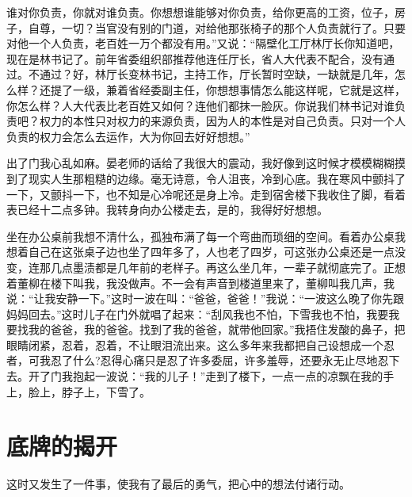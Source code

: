 \documentclass[12pt,oneside]{book}
\begin{document}
谁对你负责，你就对谁负责。你想想谁能够对你负责，给你更高的工资，位子，房子，自尊，一切？当官没有别的门道，对给他那张椅子的那个人负责就行了。只要对他一个人负责，老百姓一万个都没有用。''又说：``隔壁化工厅林厅长你知道吧，现在是林书记了。前年省委组织部推荐他连任厅长，省人大代表不配合，没有通过。不通过？好，林厅长变林书记，主持工作，厅长暂时空缺，一缺就是几年，怎么样？还提了一级，兼着省经委副主任，你想想事情怎么能这样呢，它就是这样，你怎么样？人大代表比老百姓又如何？连他们都抹一脸灰。你说我们林书记对谁负责吧？权力的本性只对权力的来源负责，因为人的本性是对自己负责。只对一个人负责的权力会怎么去运作，大为你回去好好想想。''

出了门我心乱如麻。晏老师的话给了我很大的震动，我好像到这时候才模模糊糊摸到了现实人生那粗糙的边缘。毫无诗意，令人沮丧，冷到心底。我在寒风中颤抖了一下，又颤抖一下，也不知是心冷呢还是身上冷。走到宿舍楼下我收住了脚，看着表已经十二点多钟。我转身向办公楼走去，是的，我得好好想想。

坐在办公桌前我想不清什么，孤独布满了每一个弯曲而琐细的空间。看着办公桌我想着自己在这张桌子边也坐了四年多了，人也老了四岁，可这张办公桌还是一点没变，连那几点墨渍都是几年前的老样子。再这么坐几年，一辈子就彻底完了。正想着董柳在楼下叫我，我没做声。不一会有声音到楼道里来了，董柳叫我几声，我说：``让我安静一下。''这时一波在叫：``爸爸，爸爸！''我说：``一波这么晚了你先跟妈妈回去。''这时儿子在门外就唱了起来：``刮风我也不怕，下雪我也不怕，我要我要找我的爸爸，我的爸爸。找到了我的爸爸，就带他回家。''我捂住发酸的鼻子，把眼睛闭紧，忍着，忍着，不让眼泪流出来。这么多年来我都把自己设想成一个忍者，可我忍了什么?忍得心痛只是忍了许多委屈，许多羞辱，还要永无止尽地忍下去。开了门我抱起一波说：``我的儿子！''走到了楼下，一点一点的凉飘在我的手上，脸上，脖子上，下雪了。


\chapter{底牌的揭开}

这时又发生了一件事，使我有了最后的勇气，把心中的想法付诸行动。
\end{document}
